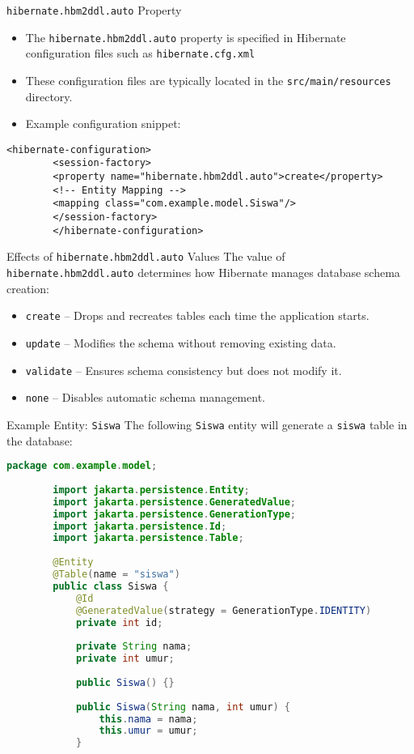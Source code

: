 \documentclass[aspectratio=169, table]{beamer}
\begin{document}
\begin{frame}[fragile]{\texttt{hibernate.hbm2ddl.auto} Property}
	\vspace{20pt}
	\begin{itemize}
		\item The \texttt{hibernate.hbm2ddl.auto} property is specified in Hibernate configuration files such as \texttt{hibernate.cfg.xml}
		\item These configuration files are typically located in the \texttt{src/main/resources} directory.
		\item Example configuration snippet:
	\end{itemize}
	
	\begin{lstlisting}[style=XmlStyle]
		<hibernate-configuration>
		<session-factory>
		<property name="hibernate.hbm2ddl.auto">create</property>
		<!-- Entity Mapping -->
		<mapping class="com.example.model.Siswa"/>
		</session-factory>
		</hibernate-configuration>
	\end{lstlisting}
\end{frame}


\begin{frame}{Effects of \texttt{hibernate.hbm2ddl.auto} Values}
	\vspace{20pt}
	The value of \texttt{hibernate.hbm2ddl.auto} determines how Hibernate manages database schema creation:
	\begin{itemize}
		\item \texttt{create} – Drops and recreates tables each time the application starts.
		\item \texttt{update} – Modifies the schema without removing existing data.
		\item \texttt{validate} – Ensures schema consistency but does not modify it.
		\item \texttt{none} – Disables automatic schema management.
	\end{itemize}
\end{frame}

\begin{frame}[fragile]{Example Entity: \texttt{Siswa}}
	\vspace{20pt}
	The following \texttt{Siswa} entity will generate a \texttt{siswa} table in the database:
	
	\begin{lstlisting}[language=Java, style=JavaStyle]
		package com.example.model;
		
		import jakarta.persistence.Entity;
		import jakarta.persistence.GeneratedValue;
		import jakarta.persistence.GenerationType;
		import jakarta.persistence.Id;
		import jakarta.persistence.Table;
		
		@Entity
		@Table(name = "siswa")
		public class Siswa {
			@Id
			@GeneratedValue(strategy = GenerationType.IDENTITY)
			private int id;
			
			private String nama;
			private int umur;
			
			public Siswa() {}
			
			public Siswa(String nama, int umur) {
				this.nama = nama;
				this.umur = umur;
			}
		\end{lstlisting}
	\end{frame}
	
\end{document}
